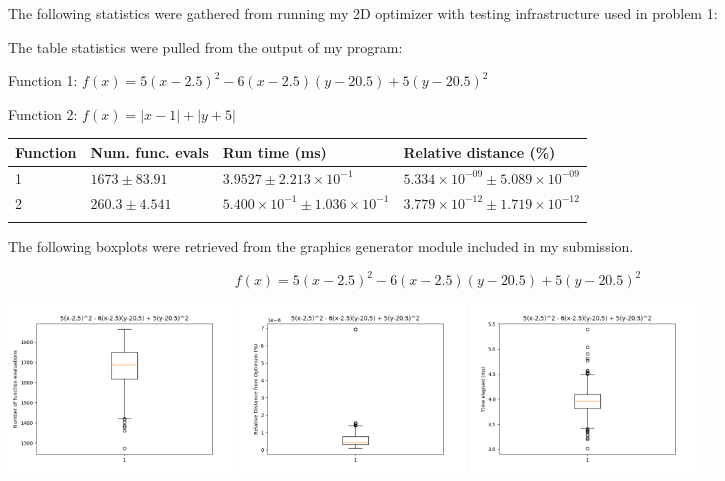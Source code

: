 \documentclass[11pt]{article}
\begin{document}
\begin{enumerate}
\begin{enumerate}
	The following statistics were gathered from running my 2D optimizer with testing infrastructure used in problem 1:
	
	The table statistics were pulled from the output of my program: 
	
	Function 1: $f(x) = 5(x-2.5)^2 - 6(x-2.5)(y-20.5) + 5(y-20.5)^2 $
	
	Function 2: $f(x) = |x - 1| + |y + 5|$
	\vspace{5mm}
	
	\begin{tabular}{*4l}    \toprule
		
		
		Function    & Num. func. evals  & Run time (ms)  & Relative distance (\%) \\\toprule
		 1& $1673 \pm 83.91 $ & $3.9527 \pm 2.213 \times 10^{-1}$ & $5.334 \times 10^{-09} \pm 5.089 \times 10^{-09}$\\
		 2 & $260.3 \pm 4.541$ & $5.400 \times 10^{-1} \pm 1.036 \times 10^{-1}$  & $3.779 \times 10^{-12} \pm 1.719 \times 10^{-12}$\\\\
		
	\end{tabular}
	
	\vspace{5mm}
	
	The following boxplots were retrieved from the graphics generator module included in my submission.
	
	$$f(x) = 5(x-2.5)^2 - 6(x-2.5)(y-20.5) + 5(y-20.5)^2 $$
	
	\includegraphics[width=6cm]{report_images/2d_func_1/Number_of_function_evaluations.png}
	\includegraphics[width=6cm]{report_images/2d_func_1/Relative_Distance_from_Optimum.png}
	\includegraphics[width=6cm]{report_images/2d_func_1/Time_elapsed.png}
	

\end{enumerate}
\end{enumerate}
\end{document}
